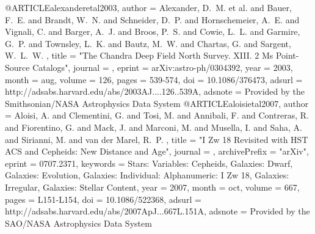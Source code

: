 {@ARTICLE{alexanderetal2003,
   author = {{Alexander}, D.~M. et al. and {Bauer}, F.~E. and {Brandt}, W.~N. and 
	{Schneider}, D.~P. and {Hornschemeier}, A.~E. and {Vignali}, C. and 
	{Barger}, A.~J. and {Broos}, P.~S. and {Cowie}, L.~L. and {Garmire}, G.~P. and 
	{Townsley}, L.~K. and {Bautz}, M.~W. and {Chartas}, G. and {Sargent}, W.~L.~W.
	},
    title = "{The Chandra Deep Field North Survey. XIII. 2 Ms Point-Source Catalogs}",
  journal = {\aj},
   eprint = {arXiv:astro-ph/0304392},
     year = 2003,
    month = aug,
   volume = 126,
    pages = {539-574},
      doi = {10.1086/376473},
   adsurl = {http://adsabs.harvard.edu/abs/2003AJ....126..539A},
  adsnote = {Provided by the Smithsonian/NASA Astrophysics Data System}
}
@ARTICLE{aloisietal2007,
   author = {{Aloisi}, A. and {Clementini}, G. and {Tosi}, M. and {Annibali}, F. and 
	{Contreras}, R. and {Fiorentino}, G. and {Mack}, J. and {Marconi}, M. and 
	{Musella}, I. and {Saha}, A. and {Sirianni}, M. and {van der Marel}, R.~P.
	},
    title = "{I Zw 18 Revisited with HST ACS and Cepheids: New Distance and Age}",
  journal = {\apjl},
archivePrefix = "arXiv",
   eprint = {0707.2371},
 keywords = {Stars: Variables: Cepheids, Galaxies: Dwarf, Galaxies: Evolution, Galaxies: Individual: Alphanumeric: I Zw 18, Galaxies: Irregular, Galaxies: Stellar Content},
     year = 2007,
    month = oct,
   volume = 667,
    pages = {L151-L154},
      doi = {10.1086/522368},
   adsurl = {http://adsabs.harvard.edu/abs/2007ApJ...667L.151A},
  adsnote = {Provided by the SAO/NASA Astrophysics Data System}
}



}
